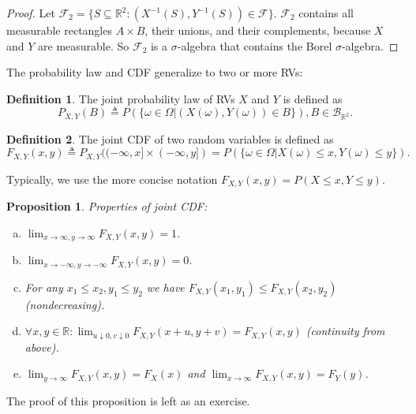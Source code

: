 \documentclass{book}
\theoremstyle{plain}%
\newtheorem{proposition}{Proposition}[section]
\theoremstyle{definition}
\newtheorem{definition}{Definition}[section]
\newlength{\arrow}
\begin{document}
\begin{proof} Let $\mathcal F_2=\{S\subseteq \mathbb{R}^2\colon (X^{-1}(S),Y^{-1}(S))\in \mathcal F\}$. $\mathcal F_2$ contains all measurable rectangles $A\times B$, their unions, and their complements, because $X$ and $Y$ are measurable.  So $\mathcal F_2$ is a $\sigma$-algebra that contains the Borel $\sigma$-algebra.
\end{proof}


The probability law and CDF generalize to two or more RVs:

\begin{definition}
The joint probability law of RVs $X$ and $Y$ is defined as 
$$P_{X,Y}(B) \triangleq P(\{\omega \in \Omega | (X(\omega), Y(\omega)) \in B\}), B \in \mathcal{B}_{\mathbb{R}^2}.$$
\end{definition}

\begin{definition}
The joint CDF of two random variables is defined as
$$F_{X,Y}(x,y) \triangleq P_{X,Y}((-\infty,x] \times (-\infty,y]) = P(\{\omega \in \Omega | X(\omega) \leq x, Y(\omega) \leq y\}).$$
\end{definition}

Typically, we use the more concise notation $F_{X,Y}(x,y) = P(X \leq x, Y \leq y)$.

\begin{proposition}
Properties of joint CDF:

\begin{enumerate}[(a)]
\item $\displaystyle \lim_{x \rightarrow \infty, y \rightarrow \infty} F_{X,Y}(x,y) = 1$.
\item $\displaystyle \lim_{x \rightarrow -\infty, y \rightarrow -\infty} F_{X,Y}(x,y) = 0$.
\item For any $x_1 \leq x_2, y_1 \leq y_2$ we have $F_{X,Y}(x_1,y_1) \leq F_{X,Y}(x_2,y_2)$ \textit{(nondecreasing)}.
\item $\forall x,y \in \mathbb{R}: \displaystyle \lim_{u \downarrow 0, v \downarrow 0} F_{X,Y}(x + u,y +v) = F_{X,Y}(x,y)$ \textit{(continuity from above)}.
\item $\displaystyle \lim_{y \rightarrow \infty} F_{X,Y}(x,y) = F_X(x)$ and $\displaystyle \lim_{x \rightarrow \infty} F_{X,Y}(x,y) = F_Y(y)$.
\end{enumerate}\label{prop:joint}
\end{proposition}

The proof of this proposition is left as an exercise.
\end{document}
